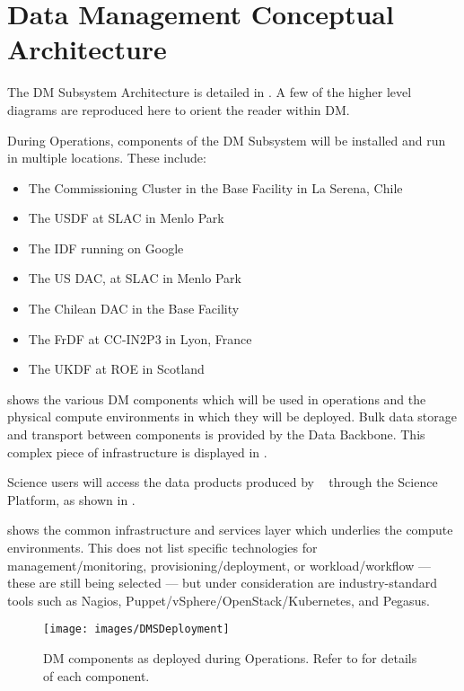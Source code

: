 \section{Data Management Conceptual Architecture \label{sect:dmarc}}

The \gls{DM} \gls{Subsystem} Architecture is detailed in .
A few of the higher level diagrams are reproduced here to orient the reader within \gls{DM}.

During \gls{Operations}, components of the \gls{DM} \gls{Subsystem} will be installed and run in
multiple locations. These include:

\begin{itemize}
\item The \gls{Commissioning} Cluster in the \gls{Base Facility} in La Serena, Chile
\item The \gls{USDF} at \gls{SLAC} in Menlo Park
\item The \gls{IDF} running on Google
\item The \gls{US} \gls{DAC},  at \gls{SLAC} in Menlo Park
\item The Chilean \gls{DAC} in the \gls{Base Facility}
\item The \gls{FrDF} at \gls{CC-IN2P3} in Lyon, France
\item The \gls{UKDF} at \gls{ROE} in Scotland
\end{itemize}

 shows the various \gls{DM} components which will be used in operations and the physical compute environments in which they will be deployed.
Bulk data storage and transport between components is provided by the \gls{Data Backbone}. This complex piece of infrastructure is displayed in .

Science users will access the data products produced by \VRO~ through the
Science Platform, as shown in .

 shows the common infrastructure and services layer which underlies the compute environments.
This does not list specific technologies for management/monitoring, provisioning/deployment, or workload/workflow --- these are still being selected --- but under consideration are industry-standard tools such as Nagios, Puppet/vSphere/OpenStack/Kubernetes, and Pegasus.

\begin{figure}[htbp]
\begin{center}
\texttt{[image: images/DMSDeployment]}
\caption{DM components as deployed during \gls{Operations}. Refer to  for details of each component.}
\label{fig:dmsdeploy}
\end{center}
\end{figure}

